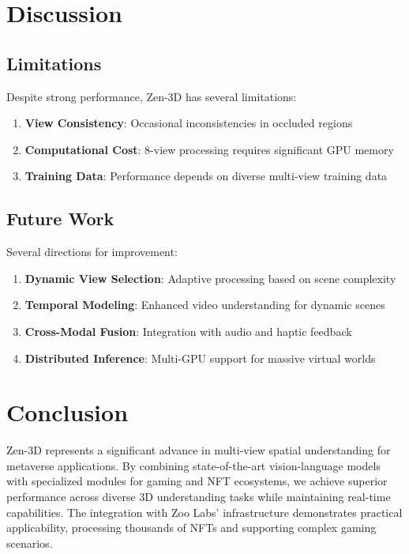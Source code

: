 \documentclass[11pt,a4paper]{article}
\begin{document}
\section{Discussion}

\subsection{Limitations}

Despite strong performance, Zen-3D has several limitations:

\begin{enumerate}
    \item \textbf{View Consistency}: Occasional inconsistencies in occluded regions
    \item \textbf{Computational Cost}: 8-view processing requires significant GPU memory
    \item \textbf{Training Data}: Performance depends on diverse multi-view training data
\end{enumerate}

\subsection{Future Work}

Several directions for improvement:

\begin{enumerate}
    \item \textbf{Dynamic View Selection}: Adaptive processing based on scene complexity
    \item \textbf{Temporal Modeling}: Enhanced video understanding for dynamic scenes
    \item \textbf{Cross-Modal Fusion}: Integration with audio and haptic feedback
    \item \textbf{Distributed Inference}: Multi-GPU support for massive virtual worlds
\end{enumerate}

\section{Conclusion}

Zen-3D represents a significant advance in multi-view spatial understanding for metaverse applications. By combining state-of-the-art vision-language models with specialized modules for gaming and NFT ecosystems, we achieve superior performance across diverse 3D understanding tasks while maintaining real-time capabilities. The integration with Zoo Labs' infrastructure demonstrates practical applicability, processing thousands of NFTs and supporting complex gaming scenarios.
\end{document}
